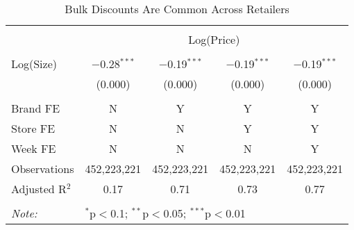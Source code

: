 
\begin{table}[!htbp] \centering
  \caption{Bulk Discounts Are Common Across Retailers}
  \label{tab:bulkDiscountScanner}
\begin{tabular}{@{\extracolsep{5pt}}lcccc}
\\[-1.8ex]\hline
\hline \\[-1.8ex]
 & \multicolumn{4}{c}{Log(Price)} \\
\cline{2-5}
\hline \\[-1.8ex]
Log(Size)           & $-$0.28$^{***}$ &  $-$0.19$^{***}$ & $-$0.19$^{***}$ & $-$0.19$^{***}$ \\
                    & (0.000)        & (0.000)          & (0.000)        & (0.000) \\
 \hline \\[-1.8ex]
Brand FE            & N               & Y                 & Y               & Y         \\
Store FE            & N               & N                 & Y               & Y         \\
Week FE             & N               & N                 & N               & Y         \\
Observations        & 452,223,221     & 452,223,221       & 452,223,221     & 452,223,221 \\
Adjusted R$^{2}$    & 0.17            & 0.71              & 0.73            & 0.77 \\
\hline
\hline \\[-1.8ex]
\textit{Note:}  & \multicolumn{4}{l}{$^{*}$p$<$0.1; $^{**}$p$<$0.05; $^{***}$p$<$0.01} \\
\end{tabular}
\end{table}
